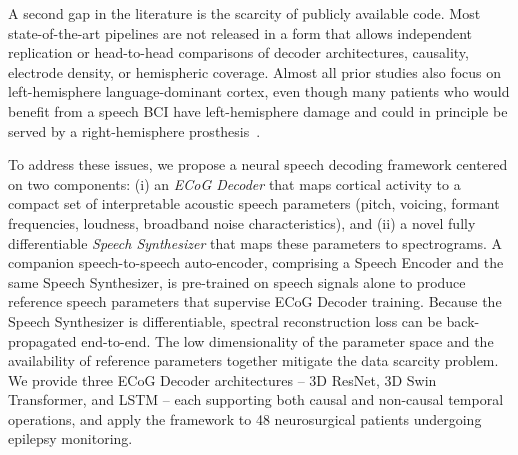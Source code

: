\documentclass[10pt]{article}
\begin{document}
A second gap in the literature is the scarcity of publicly available code. Most state-of-the-art pipelines are not released in a form that allows independent replication or head-to-head comparisons of decoder architectures, causality, electrode density, or hemispheric coverage. Almost all prior studies also focus on left-hemisphere language-dominant cortex, even though many patients who would benefit from a speech BCI have left-hemisphere damage and could in principle be served by a right-hemisphere prosthesis~\cite{lorach2023walking}.

To address these issues, we propose a neural speech decoding framework centered on two components: (i) an \emph{ECoG Decoder} that maps cortical activity to a compact set of interpretable acoustic speech parameters (pitch, voicing, formant frequencies, loudness, broadband noise characteristics), and (ii) a novel fully differentiable \emph{Speech Synthesizer} that maps these parameters to spectrograms. A companion speech-to-speech auto-encoder, comprising a Speech Encoder and the same Speech Synthesizer, is pre-trained on speech signals alone to produce reference speech parameters that supervise ECoG Decoder training. Because the Speech Synthesizer is differentiable, spectral reconstruction loss can be back-propagated end-to-end. The low dimensionality of the parameter space and the availability of reference parameters together mitigate the data scarcity problem. We provide three ECoG Decoder architectures -- 3D ResNet, 3D Swin Transformer, and LSTM -- each supporting both causal and non-causal temporal operations, and apply the framework to 48 neurosurgical patients undergoing epilepsy monitoring.
\end{document}
